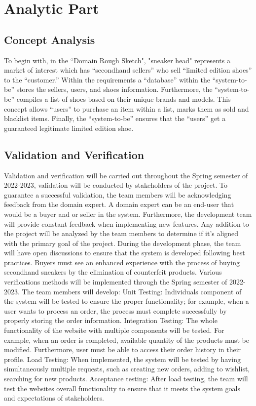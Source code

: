\chapter{Analytic Part}
\newpage
\section{Concept Analysis}
\hspace{1cm} To begin with, in the “Domain Rough Sketch", 
"sneaker head" represents a market of interest which has “secondhand sellers” who sell “limited edition shoes” to the “customer.” 
Within the requirements a “database” within the “system-to-be” stores the sellers, users, and shoes information. 
Furthermore, the “system-to-be” compiles a list of shoes based on their unique brands and models. 
This concept allows “users” to purchase an item within a list, marks them as sold and blacklist items.
Finally, the “system-to-be” ensures that the “users” get a guaranteed legitimate limited edition shoe.
\section{Validation and Verification}
\hspace{1cm} Validation and verification will be carried out throughout the Spring semester of 2022-2023, 
validation will be conducted by stakeholders of the project. To guarantee a successful validation, the 
team members will be acknowledging feedback from the domain expert. A domain expert can be an
end-user that would be a buyer and or seller in the system. Furthermore, the development team will 
provide constant feedback when implementing new features. Any addition to the project will be 
analyzed by the team members to determine if it’s aligned with the primary goal of the project. During 
the development phase, the team will have open discussions to ensure that the system is developed following
best practices. Buyers must see an enhanced experience with the process of buying secondhand
sneakers by the elimination of counterfeit products. 
Various verifications methods will be implemented through the Spring semester of 2022-2023. The team 
members will develop:
Unit Testing: Individuals component of the system will be tested to ensure the proper functionality; for 
example, when a user wants to process an order, the process must complete successfully by properly 
storing the order information.
Integration Testing: The whole functionality of the website with multiple components will be tested. For 
example, when an order is completed, available quantity of the products must be modified. 
Furthermore, user must be able to access their order history in their profile.
Load Testing: When implemented, the system will be tested by having simultaneously multiple requests, 
such as creating new orders, adding to wishlist, searching for new products.
Acceptance testing: After load testing, the team will test the websites overall functionality to ensure
that it meets the system goals and expectations of stakeholders. 
